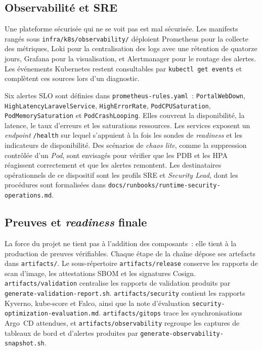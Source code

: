 \subsection{Observabilité et SRE}
\label{subsec:concepts-observabilite}

Une plateforme sécurisée qui ne se voit pas est mal sécurisée. Les
manifests rangés sous \texttt{infra/k8s/observability/} déploient
Prometheus pour la collecte des métriques, Loki pour la centralisation
des logs avec une rétention de quatorze jours, Grafana pour la
visualisation, et Alertmanager pour le routage des alertes. Les
événements Kubernetes restent consultables par \texttt{kubectl get
events} et complètent ces sources lors d'un diagnostic.

Six alertes SLO sont définies dans \texttt{prometheus-rules.yaml}~:
\texttt{PortalWebDown}, \texttt{HighLatencyLaravelService},
\texttt{HighErrorRate}, \texttt{PodCPUSaturation},
\texttt{PodMemorySaturation} et \texttt{PodCrashLooping}. Elles couvrent
la disponibilité, la latence, le taux d'erreurs et les saturations
ressources. Les services exposent un \emph{endpoint} \texttt{/health}
sur lequel s'appuient à la fois les sondes de \emph{readiness} et les
indicateurs de disponibilité. Des scénarios de \emph{chaos lite}, comme
la suppression contrôlée d'un \emph{Pod}, sont envisagés pour vérifier
que les PDB et les HPA réagissent correctement et que les alertes
remontent. Les destinataires opérationnels de ce dispositif sont les
profils SRE et \emph{Security Lead}, dont les procédures sont
formalisées dans \texttt{docs/runbooks/runtime-security-operations.md}.

\subsection{Preuves et \emph{readiness} finale}
\label{subsec:concepts-preuves}

La force du projet ne tient pas à l'addition des composants~: elle tient
à la production de preuves vérifiables. Chaque étape de la chaîne
dépose ses artefacts dans \texttt{artifacts/}. Le sous-répertoire
\texttt{artifacts/release} conserve les rapports de scan d'image, les
attestations SBOM et les signatures Cosign. \texttt{artifacts/validation}
centralise les rapports de validation produits par
\texttt{generate-validation-report.sh}. \texttt{artifacts/security}
contient les rapports Kyverno, kube-score et Falco, ainsi que la note
d'évaluation \texttt{security-optimization-evaluation.md}.
\texttt{artifacts/gitops} trace les synchronisations Argo~CD attendues, et
\texttt{artifacts/observability} regroupe les captures de tableaux de
bord et d'alertes produites par \texttt{generate-observability-snapshot.sh}.


